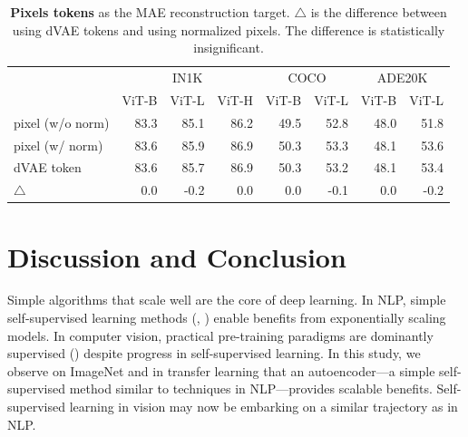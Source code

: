 \documentclass[10pt,twocolumn,letterpaper]{article}
\newcommand{\tablestyle}[2]{\setlength{\tabcolsep}{#1}\renewcommand{\arraystretch}{#2}\centering\footnotesize}
\begin{document}
\begin{table}[t]
\tablestyle{3.5pt}{1.05}
\begin{tabular}{l|rrr|rr|rr}
& \multicolumn{3}{c|}{\scriptsize IN1K}
& \multicolumn{2}{c|}{\scriptsize COCO}
& \multicolumn{2}{c}{\scriptsize ADE20K} \\
& \scriptsize ViT-B & \scriptsize ViT-L & \scriptsize ViT-H
& \scriptsize ViT-B & \scriptsize ViT-L
& \scriptsize ViT-B & \scriptsize ViT-L \\
\shline
pixel (w/o norm) & 83.3 & 85.1 & 86.2 & 49.5 & 52.8 & 48.0 & 51.8 \\
pixel (w/ norm) & 83.6 & 85.9 & 86.9 & 50.3 & 53.3 & 48.1 & 53.6 \\
\hline
dVAE token & 83.6 & 85.7 & 86.9 & 50.3 & 53.2 & 48.1 & 53.4 \\
$\triangle$ & 0.0 & -0.2 & 0.0 & 0.0 & -0.1 & 0.0 & -0.2
\end{tabular}
\vspace{-.7em}
\caption{\textbf{Pixels \vs tokens} as the MAE reconstruction target. $\triangle$ is the difference between using dVAE tokens and using normalized pixels. The difference is statistically insignificant.}
\label{tab:pixel_vs_token} \vspace{-0.5em}
\end{table}

\section{Discussion and Conclusion}

Simple algorithms that scale well are the core of deep learning. In NLP, simple self-supervised learning methods (\eg, \cite{Radford2018, Devlin2019, Radford2019, Brown2020}) enable benefits from exponentially scaling models. In computer vision, practical pre-training paradigms are dominantly supervised (\eg \cite{Krizhevsky2012,Simonyan2015,He2016,Dosovitskiy2021}) despite progress in self-supervised learning. In this study, we observe on ImageNet and in transfer learning that an autoencoder---a simple self-supervised method similar to techniques in NLP---provides scalable benefits. Self-supervised learning in vision may now be embarking on a similar trajectory as in NLP.
\end{document}
